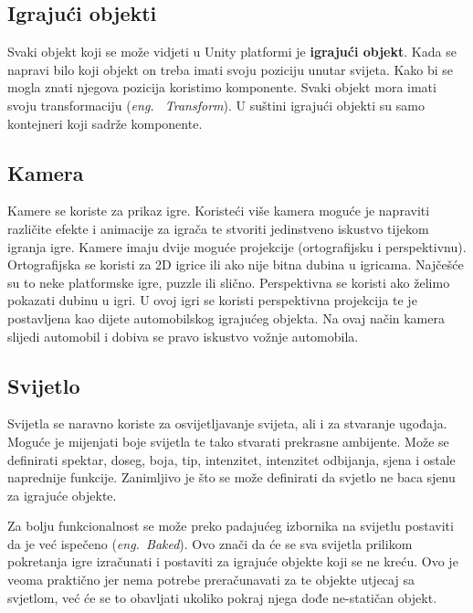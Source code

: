 \subsection{Igrajući objekti}
Svaki objekt koji se može vidjeti u Unity platformi je \textbf{igrajući objekt}. Kada se napravi bilo koji objekt on treba imati svoju poziciju unutar svijeta. Kako bi se mogla znati njegova pozicija koristimo komponente. Svaki objekt mora imati svoju transformaciju (\emph{eng.~ Transform}). U suštini igrajući objekti su samo kontejneri koji sadrže komponente.

\subsection{Kamera}
Kamere se koriste za prikaz igre. Koristeći više kamera moguće je napraviti različite efekte i animacije za igrača te stvoriti jedinstveno iskustvo tijekom igranja igre. Kamere imaju dvije moguće projekcije (ortografijsku i perspektivnu). Ortografijska se koristi za 2D igrice ili ako nije bitna dubina u igricama. Najčešće su to neke platformske igre, puzzle ili slično. Perspektivna se koristi ako želimo pokazati dubinu u igri. U ovoj igri se koristi perspektivna projekcija te je postavljena kao dijete automobilskog igrajućeg objekta. Na ovaj način kamera slijedi automobil i dobiva se pravo iskustvo vožnje automobila.
\subsection{Svijetlo}
Svijetla se naravno koriste za osvijetljavanje svijeta, ali i za stvaranje ugođaja. Moguće je mijenjati boje svijetla te tako stvarati prekrasne ambijente. Može se definirati spektar, doseg, boja, tip, intenzitet, intenzitet odbijanja, sjena i ostale naprednije funkcije. Zanimljivo je što se može definirati da svjetlo ne baca sjenu za igrajuće objekte.

Za bolju funkcionalnost se može preko padajućeg izbornika na svijetlu postaviti da je već ispečeno (\emph{eng.~Baked}). Ovo znači da će se sva svijetla prilikom pokretanja igre izračunati i postaviti za igrajuće objekte koji se ne kreću. Ovo je veoma praktično jer nema potrebe preračunavati za te objekte utjecaj sa svjetlom, već će se to obavljati ukoliko pokraj njega dođe ne-statičan objekt.
\newpage

